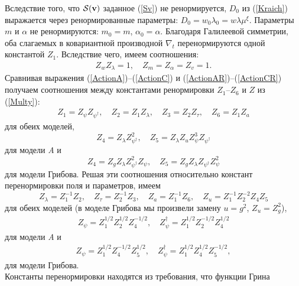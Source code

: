 \documentclass[a4paper,10pt]{article}
\def\S{{\cal S}}
\def\bfv{{\bf v}}
\def\S{{\cal S}}
\def\bfv{{\bf v}}
\begin{document}
Вследствие того, что $\S(\bfv)$ заданное (\ref{Sv}) не ренормируется, $D_{0}$ из (\ref{Kraich}) выражается через ренормированные параметры: $D_{0} = w_{0} \lambda_{0}  = w\lambda \mu^{\xi}$.
Параметры $m$ и $\alpha$ не ренормируются: $m_{0} = m$,
$\alpha_{0} = \alpha$.
Благодаря Галилеевой симметрии, оба слагаемых в ковариантной производной $\nabla_{t}$  перенормируются одной константой $Z_{1}$.
Вследствие чего, имеем соотношения:
\begin{eqnarray}
Z_{w}Z_{\lambda} =1, \quad Z_{m}= Z_{\alpha} = Z_{v} =1.
\label{RenD}
\end{eqnarray}
Сравнивая выражения (\ref{ActionA})--(\ref{ActionC}) и
(\ref{ActionAR})--(\ref{ActionCR}) получаем соотношения между константами ренормировки $Z_{1}$--$Z_{6}$ и $Z$ из (\ref{Multy}):
\begin{eqnarray}
Z_{1} = Z_{\psi} Z_{\psi^{\dagger}}, \quad Z_{2} = Z_{1}Z_{\lambda}, \quad
Z_{3} = Z_{2} Z_{\tau}, \quad Z_{6} = Z_{1} Z_{a}
\label{ZZ}
\end{eqnarray}
для обеих моделей,
\begin{equation}
Z_{4} = Z_{\lambda} Z_{\psi^{\dagger}}^{2}, \quad
Z_{5} = Z_{\lambda}Z_{u} Z_{\psi}^{3} Z_{\psi^{\dagger}}
\label{ZA}
\end{equation}
для модели {\it A} и
\begin{equation}
Z_{4} = Z_{g} Z_{\lambda} Z_{\psi^{\dagger}}^{2} Z_{\psi},
\quad Z_{5} = Z_{g} Z_{\lambda} Z_{\psi^{\dagger}} Z_{\psi}^{2}
\label{ZG}
\end{equation}
для модели Грибова.
Решая эти соотношения относительно констант перенормировки поля и параметров, имеем
\begin{equation}
Z_{\lambda} = Z_{1}^{-1} Z_{2}, \quad Z_{\tau} = Z_{2}^{-1} Z_{3}, \quad
Z_{a} = Z_{1}^{-1} Z_{6}, \quad
Z_{u} = Z_{1}^{-1} Z_{2}^{-2} Z_{4} Z_{5}
\label{ResoC}
\end{equation}
для обеих моделей (в моделе Грибова мы произвели замену $u=g^{2}$, $Z_{u}=Z_{g}^{2}$),
\begin{eqnarray}
Z_{\psi}= Z_{1}^{1/2}Z_{2}^{1/2}Z_{4}^{-1/2}, \quad
Z_{\psi}^{\dag}= Z_{1}^{1/2}Z_{2}^{-1/2}Z_{4}^{1/2}
\label{ResoA}
\end{eqnarray}
для модели {\it A} и
\begin{eqnarray}
Z_{\psi}= Z_{1}^{1/2}Z_{4}^{-1/2}Z_{5}^{1/2}, \quad
Z_{\psi}^{\dag}= Z_{1}^{1/2}Z_{4}^{1/2}Z_{5}^{-1/2},
\label{ResoG}
\end{eqnarray}
для модели Грибова.\\
Константы перенормировки находятся из требования, что функции Грина
\end{document}

